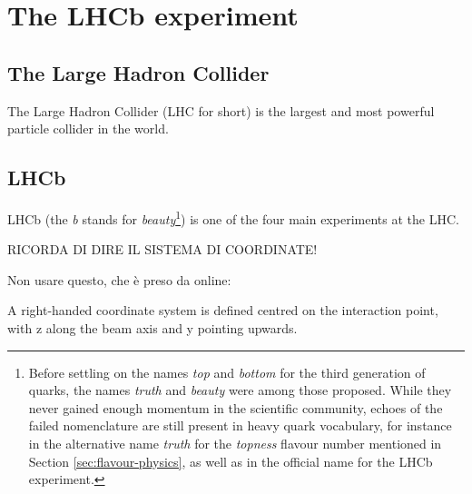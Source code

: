 \chapter{The LHCb experiment}
\label{cap:LHCb}

\section{The Large Hadron Collider}
The Large Hadron Collider (LHC for short) is the largest and most powerful particle collider in the world.

\section{LHCb}
LHCb (the \textit{b} stands for \textit{beauty}\footnote{Before settling on the names \textit{top} and \textit{bottom} for the third generation of quarks, the names \textit{truth} and \textit{beauty} were among those proposed. While they never gained enough momentum in the scientific community, echoes of the failed nomenclature are still present in heavy quark vocabulary, for instance in the alternative name \textit{truth} for the \textit{topness} flavour number mentioned in Section \ref{sec:flavour-physics}, as well as in the official name for the LHCb experiment.}) is one of the four main experiments at the LHC.

RICORDA DI DIRE IL SISTEMA DI COORDINATE!

Non usare questo, che è preso da online:

\label{info:LHCb_system}
A right-handed coordinate system is defined centred on the interaction point, with z along the beam axis and y pointing upwards.